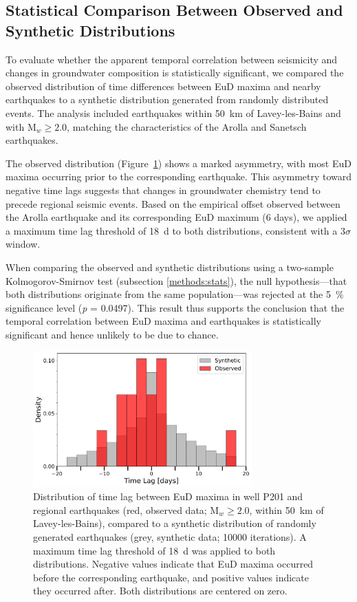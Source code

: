 \subsection{Statistical Comparison Between Observed and Synthetic Distributions}
To evaluate whether the apparent temporal correlation between seismicity and changes in groundwater composition is statistically significant, we compared the observed distribution of time differences between EuD maxima and nearby earthquakes to a synthetic distribution generated from randomly distributed events.
The analysis included earthquakes within \SI{50}{\kilo\meter} of Lavey-les-Bains and with M$_w \geq 2.0$, matching the characteristics of the Arolla and Sanetsch earthquakes.

The observed distribution (Figure~\ref{fig:distributions_P201}) shows a marked asymmetry, with most EuD maxima occurring prior to the corresponding earthquake.
This asymmetry toward negative time lags suggests that changes in groundwater chemistry tend to precede regional seismic events.
Based on the empirical offset observed between the Arolla earthquake and its corresponding EuD maximum (6 days), we applied a maximum time lag threshold of \SI{18}{\day} to both distributions, consistent with a 3$\sigma$ window.

When comparing the observed and synthetic distributions using a two-sample Kolmogorov-Smirnov test (subsection \ref{methods:stats}), the null hypothesis---that both distributions originate from the same population---was rejected at the \SI{5}{\percent} significance level (\textit{p} = 0.0497).
This result thus supports the conclusion that the temporal correlation between EuD maxima and earthquakes is statistically significant and hence unlikely to be due to chance.

\begin{figure}[H]
    \centering
    \includegraphics[width=0.75\textwidth]{chapters/04_chap3/figures/distribution_earthquakes_wo_outliers_well_201.pdf}
    \caption{Distribution of time lag between EuD maxima in well P201 and regional earthquakes (red, observed data; M$_w \geq 2.0$, within \SI{50}{\kilo\meter} of Lavey-les-Bains), compared to a synthetic distribution of randomly generated earthquakes (grey, synthetic data; \num{10000} iterations).
    A maximum time lag threshold of \SI{18}{\day} was applied to both distributions.
    Negative values indicate that EuD maxima occurred before the corresponding earthquake, and positive values indicate they occurred after.
    Both distributions are centered on zero.
    }
    \label{fig:distributions_P201}
\end{figure}

